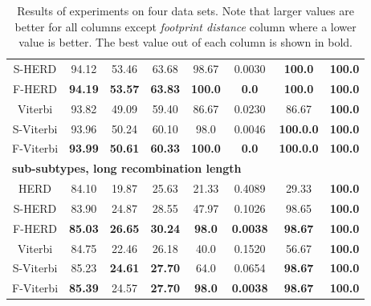 \begin{table}
\begin{center}
\begin{tabular}{cccccccc}
S-HERD   &94.12     & 53.46     & 63.68     & 98.67     &     0.0030    &   \bf 100.0 &\bf 100.0  \\
F-HERD   &\bf 94.19 & \bf 53.57 & \bf 63.83 & \bf 100.0   & \bf    0.0    & \bf 100.0   &\bf 100.0  \\\hline
Viterbi  &     93.82&     49.09 &     59.40 &     86.67 &     0.0230    &     86.67 &\bf 100.0  \\
S-Viterbi&     93.96&     50.24 &     60.10 &      98.0 &     0.0046    & \bf 100.0.0 &\bf 100.0  \\
F-Viterbi& \bf 93.99& \bf 50.61 & \bf 60.33 & \bf 100.0 & \bf    0.0    & \bf 100.0.0 &\bf 100.0  \\\hline\hline
\multicolumn{8}{l}{\bf sub-subtypes, long recombination length}\\\hline
HERD     &84.10     & 19.87     & 25.63     & 21.33     &     0.4089    & 29.33     &\bf 100.0  \\
S-HERD   &83.90     & 24.87     & 28.55     & 47.97     &     0.1026    &     98.65 &\bf 100.0  \\
F-HERD   &\bf 85.03 & \bf 26.65 & \bf 30.24 & \bf 98.0  & \bf 0.0038    & \bf 98.67 &\bf 100.0  \\\hline
Viterbi  &     84.75&     22.46 &     26.18 &    40.0   &     0.1520    &     56.67 &\bf 100.0  \\
S-Viterbi&     85.23&\bf  24.61 & \bf 27.70 &    64.0   &     0.0654    & \bf 98.67 &\bf 100.0  \\
F-Viterbi&\bf  85.39&     24.57 & \bf 27.70 &\bf 98.0   & \bf 0.0038    & \bf 98.67 &\bf 100.0  \\
\end{tabular}
\end{center}
\caption[Accuracy of decodings with fixed footprint/set.]{Results of experiments
on four data sets. Note that larger values are better for all columns  except
{\it footprint distance} column where a lower value is better. The best value out of
each column is shown in bold.}\label{HERD:EXPTABLE}
\end{table}

